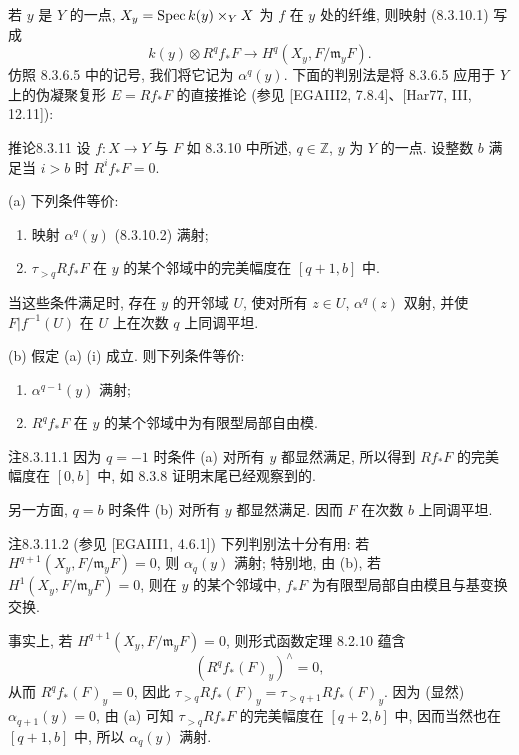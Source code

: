 若 $y$ 是 $Y$ 的一点, $X_y=\operatorname{Spec} k(y)\times_YX$ 为 $f$ 在 $y$ 处的纤维, 则映射 (8.3.10.1) 写成
\begin{equation}k(y)\otimes R^qf_*F\longrightarrow H^q(X_y,F/\mathfrak m_yF).\tag{8.3.10.2}\label{ch08:eq83102}\end{equation}
仿照 8.3.6.5 中的记号, 我们将它记为 $\alpha^q(y)$. 下面的判别法是将 8.3.6.5 应用于 $Y$ 上的伪凝聚复形 $E=Rf_*F$ 的直接推论 (参见 [EGAIII2, 7.8.4]、[Har77, III, 12.11]):

\begin{origstatement}{推论}{8.3.11}\label{ch08:cor8311}
设 $f:X\to Y$ 与 $F$ 如 8.3.10 中所述, $q\in\mathbb Z$, $y$ 为 $Y$ 的一点. 设整数 $b$ 满足当 $i>b$ 时 $R^if_*F=0$.

(a) 下列条件等价:
\begin{enumerate}
\item[(i)] 映射 $\alpha^q(y)$ (8.3.10.2) 满射;
\item[(ii)] $\tau_{>q}Rf_*F$ 在 $y$ 的某个邻域中的完美幅度在 $[q+1,b]$ 中.
\end{enumerate}
当这些条件满足时, 存在 $y$ 的开邻域 $U$, 使对所有 $z\in U$, $\alpha^q(z)$ 双射, 并使 $F|f^{-1}(U)$ 在 $U$ 上在次数 $q$ 上同调平坦.

(b) 假定 (a) (i) 成立. 则下列条件等价:
\begin{enumerate}
\item[(i)] $\alpha^{q-1}(y)$ 满射;
\item[(ii)] $R^qf_*F$ 在 $y$ 的某个邻域中为有限型局部自由模.
\end{enumerate}
\end{origstatement}

\begin{origstatement}{注}{8.3.11.1}\label{ch08:rem83111}
因为 $q=-1$ 时条件 (a) 对所有 $y$ 都显然满足, 所以得到 $Rf_*F$ 的完美幅度在 $[0,b]$ 中, 如 8.3.8 证明末尾已经观察到的.

另一方面, $q=b$ 时条件 (b) 对所有 $y$ 都显然满足. 因而 $F$ 在次数 $b$ 上同调平坦.
\end{origstatement}

\begin{origstatement}{注}{8.3.11.2}\label{ch08:rem83112}
(参见 [EGAIII1, 4.6.1]) 下列判别法十分有用: 若 $H^{q+1}(X_y,F/\mathfrak m_yF)=0$, 则 $\alpha_q(y)$ 满射; 特别地, 由 (b), 若 $H^1(X_y,F/\mathfrak m_yF)=0$, 则在 $y$ 的某个邻域中, $f_*F$ 为有限型局部自由模且与基变换交换.
\end{origstatement}
事实上, 若 $H^{q+1}(X_y,F/\mathfrak m_yF)=0$, 则形式函数定理 8.2.10 蕴含
\[(R^qf_*(F)_y)^\wedge=0,\]
从而 $R^qf_*(F)_y=0$, 因此 $\tau_{>q}Rf_*(F)_y=\tau_{>q+1}Rf_*(F)_y$. 因为 (显然) $\alpha_{q+1}(y)=0$, 由 (a) 可知 $\tau_{>q}Rf_*F$ 的完美幅度在 $[q+2,b]$ 中, 因而当然也在 $[q+1,b]$ 中, 所以 $\alpha_q(y)$ 满射.

